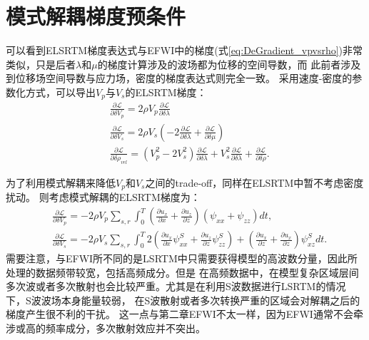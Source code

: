 \section{模式解耦梯度预条件}
可以看到ELSRTM梯度表达式与EFWI中的梯度(式\ref{eq:DeGradient_vpvsrho})非常类似，只是后者$\lambda$和$\mu$的梯度计算涉及的波场都为位移的空间导数，而
此前者涉及到位移场空间导数与应力场，密度的梯度表达式则完全一致。
采用速度-密度的参数化方式，可以导出$V_p$与$V_s$的ELSRTM梯度：
\begin{equation}
\begin{split}
   & \frac{\partial\mathcal{L}}{\partial \delta V_p}=2\rho V_p\frac{\partial\mathcal{L}}{\partial \delta \lambda}\\
   & \frac{\partial\mathcal{L}}{\partial \delta V_s}=2\rho V_s(-2\frac{\partial\mathcal{L}}{\partial \delta \lambda}
	+\frac{\partial\mathcal{L}}{\partial \delta \mu})\\
   & \frac{\partial\mathcal{L}}{\partial \delta\rho_{vel}}=(V^2_p-2V^2_s)\frac{\partial\mathcal{L}}{\partial \delta \lambda}+V^2_s\frac{\partial\mathcal{L}}{\partial \delta \lambda}+\frac{\partial\mathcal{L}}{\partial \delta\rho}.
    \label{eq:Gradient_VpVsrho_LSRTM}
\end{split}
\end{equation}

为了利用模式解耦来降低$V_p$和$V_s$之间的trade-off，同样在ELSRTM中暂不考虑密度扰动。
则考虑模式解耦的ELSRTM梯度为：
\begin{equation}
\begin{split}
   & \frac{\partial\mathcal{L}}{\partial \delta V_p}=-2\rho V_p\sum_{s,r}\int^T_{0}
	(\frac{\partial u_x}{\partial x}+\frac{\partial u_z}{\partial
	z})(\psi_{xx}+\psi_{zz})dt,\\
   & \frac{\partial\mathcal{L}}{\partial \delta V_s}=-2\rho V_s\sum_{s,r}\int^T_{0}
	2(\frac{\partial u_x}{\partial x}\psi^S_{xx}+\frac{\partial u_z}{\partial z}\psi^S_{zz})+
	(\frac{\partial u_x}{\partial z}+\frac{\partial u_x}{\partial
	z})\psi^S_{xz}dt.
    \label{eq:Gradient_Vel_LSRTM}
\end{split}
\end{equation}
需要注意，与EFWI所不同的是LSRTM中只需要获得模型的高波数分量，因此所处理的数据频带较宽，包括高频成分。但是
在高频数据中，在模型复杂区域层间多次波或者多次散射也会比较严重。尤其是在利用S波数据进行LSRTM的情况下，S波波场本身能量较弱，
在S波散射或者多次转换严重的区域会对解耦之后的梯度产生很不利的干扰。
这一点与第二章EFWI不太一样，因为EFWI通常不会牵涉或高的频率成分，多次散射效应并不突出。


